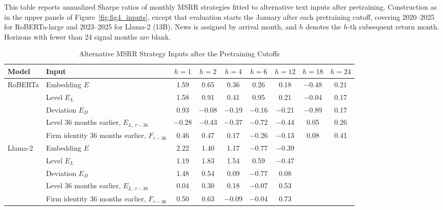 \begin{table}[htbp]
\centering
\caption{Alternative MSRR Strategy Inputs after the Pretraining Cutoffs}
\label{tab:tabC_post_constructions}
\begin{minipage}{\linewidth}\footnotesize
This table reports annualized Sharpe ratios of monthly MSRR strategies fitted to alternative text inputs after pretraining. Construction as in the upper panels of Figure~\ref{fig:fig4_inputs}, except that evaluation starts the January after each pretraining cutoff, covering 2020--2025 for RoBERTa-large and 2023--2025 for Llama-2 (13B). News is assigned by arrival month, and $h$ denotes the $h$-th subsequent return month. Horizons with fewer than 24 signal months are blank.
\end{minipage}
\medskip

{\footnotesize
\begin{adjustbox}{max width=\linewidth, max totalheight=0.75\textheight}
\begin{tabular}{llccccccc}
\toprule
Model & Input & $h=1$ & $h=2$ & $h=4$ & $h=6$ & $h=12$ & $h=18$ & $h=24$ \\
\midrule
RoBERTa & Embedding $E$ & \phantom{$-$}1.59 & \phantom{$-$}0.65 & \phantom{$-$}0.36 & \phantom{$-$}0.26 & \phantom{$-$}0.18 & $-$0.48 & 0.21 \\
 & Level $E_L$ & \phantom{$-$}1.58 & \phantom{$-$}0.91 & \phantom{$-$}0.41 & \phantom{$-$}0.95 & \phantom{$-$}0.21 & $-$0.04 & 0.17 \\
 & Deviation $E_D$ & \phantom{$-$}0.93 & $-$0.08 & $-$0.19 & $-$0.16 & $-$0.21 & $-$0.89 & 0.17 \\
 & Level 36 months earlier, $E_{L,\,\tau-36}$ & $-$0.28 & $-$0.43 & $-$0.37 & $-$0.72 & $-$0.44 & \phantom{$-$}0.05 & 0.26 \\
 & Firm identity 36 months earlier, $F_{\tau-36}$ & \phantom{$-$}0.46 & \phantom{$-$}0.47 & \phantom{$-$}0.17 & $-$0.26 & $-$0.13 & \phantom{$-$}0.08 & 0.41 \\
\midrule
Llama-2 & Embedding $E$ & \phantom{$-$}2.22 & \phantom{$-$}1.40 & \phantom{$-$}1.17 & $-$0.77 & $-$0.39 &  &  \\
 & Level $E_L$ & \phantom{$-$}1.19 & \phantom{$-$}1.83 & \phantom{$-$}1.54 & \phantom{$-$}0.59 & $-$0.47 &  &  \\
 & Deviation $E_D$ & \phantom{$-$}1.48 & \phantom{$-$}0.54 & \phantom{$-$}0.09 & $-$0.77 & \phantom{$-$}0.08 &  &  \\
 & Level 36 months earlier, $E_{L,\,\tau-36}$ & \phantom{$-$}0.04 & \phantom{$-$}0.30 & \phantom{$-$}0.18 & $-$0.07 & \phantom{$-$}0.53 &  &  \\
 & Firm identity 36 months earlier, $F_{\tau-36}$ & \phantom{$-$}0.50 & \phantom{$-$}0.63 & $-$0.09 & $-$0.04 & \phantom{$-$}0.73 &  &  \\
\bottomrule
\end{tabular}
\end{adjustbox}
}
\end{table}
